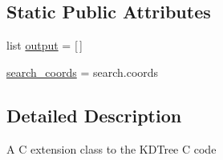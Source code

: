 \subsection*{Static Public Attributes}
\begin{DoxyCompactItemize}
\item 
list \hyperlink{classkdtree_1_1KDTreeNode_a034118b89fc7ccabb90f89bbd9fb285f}{output} = \mbox{[}$\,$\mbox{]}
\item 
\hyperlink{classkdtree_1_1KDTreeNode_a0009221654e11a29a235b080a7fa80ed}{search\_\-coords} = search.coords
\end{DoxyCompactItemize}


\subsection{Detailed Description}
\begin{DoxyVerb}A C extension class to the KDTree C code\end{DoxyVerb}
 

